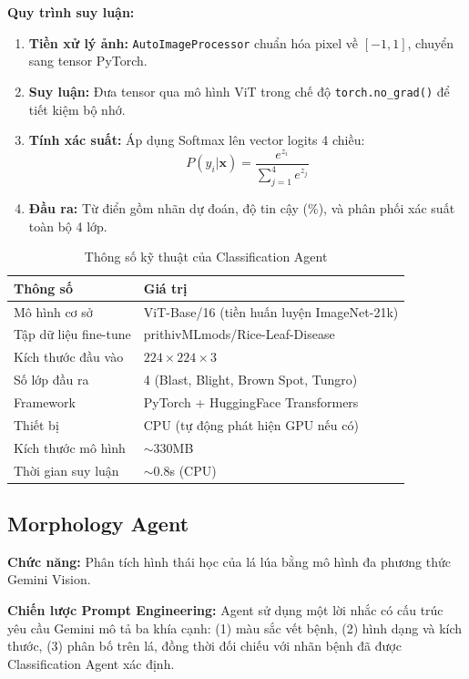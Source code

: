 \documentclass[13pt,a4paper]{extreport}
\begin{document}
\textbf{Quy trình suy luận:}
\begin{enumerate}[leftmargin=1.5cm]
    \item \textbf{Tiền xử lý ảnh:} \texttt{AutoImageProcessor} chuẩn hóa pixel về $[-1, 1]$, chuyển sang tensor PyTorch.
    \item \textbf{Suy luận:} Đưa tensor qua mô hình ViT trong chế độ \texttt{torch.no\_grad()} để tiết kiệm bộ nhớ.
    \item \textbf{Tính xác suất:} Áp dụng Softmax lên vector logits 4 chiều:
    \begin{equation}
        P(y_i | \mathbf{x}) = \frac{e^{z_i}}{\displaystyle\sum_{j=1}^{4} e^{z_j}}
        \label{eq:softmax}
    \end{equation}
    \item \textbf{Đầu ra:} Từ điển gồm nhãn dự đoán, độ tin cậy (\%), và phân phối xác suất toàn bộ 4 lớp.
\end{enumerate}

\begin{table}[H]
\centering
\caption{Thông số kỹ thuật của Classification Agent}
\label{tab:classification_spec}
\begin{tabular}{lp{9cm}}
\toprule
\textbf{Thông số} & \textbf{Giá trị} \\
\midrule
Mô hình cơ sở & ViT-Base/16 (tiền huấn luyện ImageNet-21k) \\
Tập dữ liệu fine-tune & prithivMLmods/Rice-Leaf-Disease \\
Kích thước đầu vào & $224 \times 224 \times 3$ \\
Số lớp đầu ra & 4 (Blast, Blight, Brown Spot, Tungro) \\
Framework & PyTorch + HuggingFace Transformers \\
Thiết bị & CPU (tự động phát hiện GPU nếu có) \\
Kích thước mô hình & $\sim$330MB \\
Thời gian suy luận & $\sim$0.8s (CPU) \\
\bottomrule
\end{tabular}
\end{table}

\subsection{Morphology Agent}
\textbf{Chức năng:} Phân tích hình thái học của lá lúa bằng mô hình đa phương thức Gemini Vision.

\textbf{Chiến lược Prompt Engineering:} Agent sử dụng một lời nhắc có cấu trúc yêu cầu Gemini mô tả ba khía cạnh: (1) màu sắc vết bệnh, (2) hình dạng và kích thước, (3) phân bố trên lá, đồng thời đối chiếu với nhãn bệnh đã được Classification Agent xác định.
\end{document}
